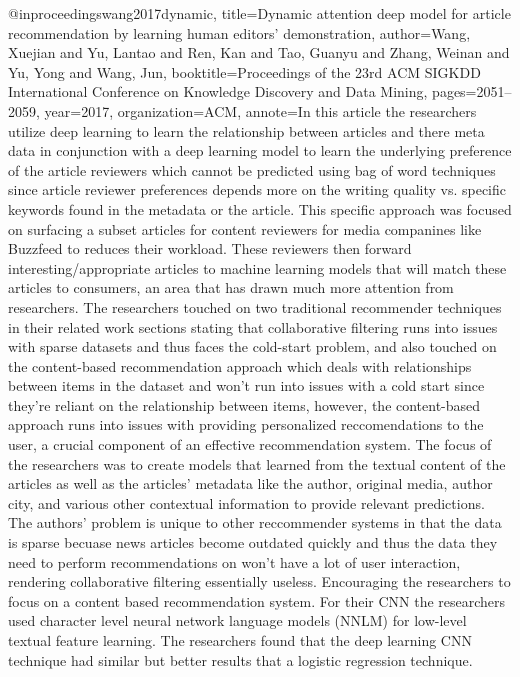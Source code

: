 @inproceedings{wang2017dynamic,
  title={Dynamic attention deep model for article recommendation by learning human editors' demonstration},
  author={Wang, Xuejian and Yu, Lantao and Ren, Kan and Tao, Guanyu and Zhang, Weinan and Yu, Yong and Wang, Jun},
  booktitle={Proceedings of the 23rd ACM SIGKDD International Conference on Knowledge Discovery and Data Mining},
  pages={2051--2059},
  year={2017},
  organization={ACM},
  annote={In this article the researchers utilize deep learning to learn the relationship between articles and there meta data in conjunction with a deep learning model to learn the underlying preference of the article reviewers which cannot be predicted using bag of word techniques since
  article reviewer preferences depends more on the writing quality vs. specific keywords found in the metadata or the article. This specific approach was focused on surfacing a subset articles for content reviewers for media companines like Buzzfeed to reduces their workload. These reviewers 
  then forward interesting/appropriate articles to machine learning models that will match these articles to consumers, an area that has drawn much more attention from researchers. The researchers touched on two traditional recommender techniques in their related work sections stating that collaborative
  filtering runs into issues with sparse datasets and thus faces the cold-start problem, and also touched on the content-based recommendation approach which deals with relationships between items in the dataset and won't run into issues with a cold start since they're reliant on the relationship between items, however,
  the content-based approach runs into issues with providing personalized reccomendations to the user, a crucial component of an effective recommendation system. The focus of the researchers was to create models that learned from the textual content of the articles as well as the articles' metadata like the author, original media,
  author city, and various other contextual information to provide relevant predictions. The authors' problem is unique to other reccommender systems in that the data is sparse becuase news articles become outdated quickly and thus the data they need to perform recommendations on won't have a lot of user interaction, rendering collaborative filtering
  essentially useless. Encouraging the researchers to focus on a content based recommendation system. For their CNN the researchers used character level neural network language models (NNLM) for low-level textual feature learning. The researchers found that the deep learning CNN technique had similar but better results that a logistic regression technique.
  }
}



